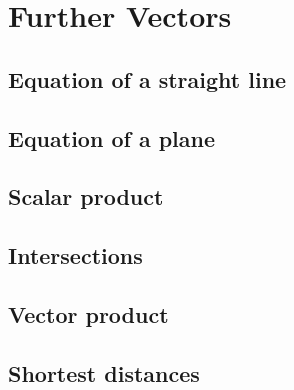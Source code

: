 \chapter{Further Vectors}
\section{Equation of a straight line}
\section{Equation of a plane}
\section{Scalar product}
\section{Intersections}
\section{Vector product}
\section{Shortest distances}